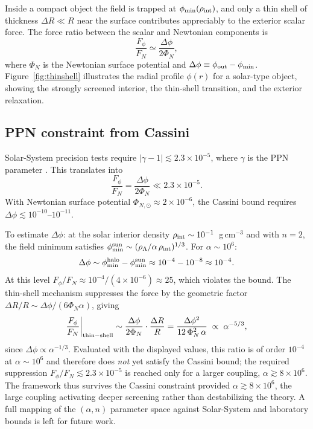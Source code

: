 \documentclass[11pt,a4paper]{article}
\begin{document}
Inside a compact object the field is trapped at $\phi_{\rm min}(\rho_{\rm int})$, and
only a thin shell of thickness $\Delta R \ll R$ near the surface contributes
appreciably to the exterior scalar force. The force ratio between the scalar and
Newtonian components is \cite{Khoury2004}
\begin{equation}
  \frac{F_\phi}{F_N} \simeq \frac{\Delta\phi}{2\Phi_N},
  \label{eq:forceratio}
\end{equation}
where $\Phi_N$ is the Newtonian surface potential and $\Delta\phi\equiv\phi_{\rm out}-\phi_{\rm min}$.
Figure~\ref{fig:thinshell} illustrates the radial profile $\phi(r)$ for a solar-type object,
showing the strongly screened interior, the thin-shell transition, and the exterior relaxation.

\subsection{PPN constraint from Cassini}
\label{subsec:PPN}

Solar-System precision tests require $|\gamma-1|\lesssim 2.3\times10^{-5}$, where
$\gamma$ is the PPN parameter \cite{Bertotti2003, Will2014}. This translates into
\begin{equation}
  \frac{F_\phi}{F_N} = \frac{\Delta\phi}{2\Phi_N} \ll 2.3\times10^{-5}.
\end{equation}
With Newtonian surface potential $\Phi_{N,\odot}\approx 2\times10^{-6}$, the Cassini
bound requires $\Delta\phi\lesssim10^{-10}$--$10^{-11}$.

To estimate $\Delta\phi$: at the solar interior density $\rho_{\rm int}\sim10^{-1}$~g\,cm$^{-3}$
and with $n=2$, the field minimum satisfies
$\phi_{\rm min}^{\rm sun}\sim(\rho_\Lambda/\alpha\,\rho_{\rm int})^{1/3}$.
For $\alpha\sim10^6$:
\begin{equation}
  \Delta\phi \sim \phi_{\rm min}^{\rm halo} - \phi_{\rm min}^{\rm sun}
  \approx 10^{-4} - 10^{-8} \approx 10^{-4}.
\end{equation}
At this level $F_\phi/F_N\approx 10^{-4}/(4\times10^{-6})\approx 25$, which violates the
bound. The thin-shell mechanism suppresses the force by the geometric factor
$\Delta R/R \sim \Delta\phi/(6\Phi_N\alpha)$, giving
\begin{equation}
  \frac{F_\phi}{F_N}\bigg|_{\rm thin-shell}
  \sim \frac{\Delta\phi}{2\Phi_N}\cdot\frac{\Delta R}{R}
  = \frac{\Delta\phi^2}{12\,\Phi_N^2\,\alpha}
  \;\propto\; \alpha^{-5/3},
\end{equation}
since $\Delta\phi\propto\alpha^{-1/3}$. Evaluated with the displayed values, this ratio is
of order $10^{-4}$ at $\alpha\sim10^{6}$ and therefore does \emph{not} yet satisfy the
Cassini bound; the required suppression $F_\phi/F_N\lesssim 2.3\times10^{-5}$ is reached
only for a larger coupling, $\alpha\gtrsim 8\times10^{6}$. The framework thus survives the
Cassini constraint provided $\alpha\gtrsim 8\times10^{6}$, the large coupling activating
deeper screening rather than destabilizing the theory. A full mapping of the
$(\alpha, n)$ parameter space against Solar-System and laboratory bounds is left for
future work.
\end{document}
